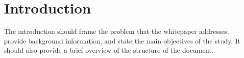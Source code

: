 \section{Introduction}
The introduction should frame the problem that the whitepaper addresses, provide background information, and state the main objectives of the study. It should also provide a brief overview of the structure of the document.
